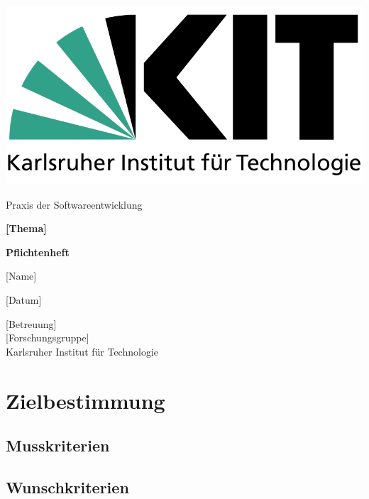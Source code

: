 \documentclass[a4paper]{scrreprt}
\begin{document}
    \begin{flushright}
        \includegraphics[scale = 0.2]{kit-logo.png}\\[0.5cm]
    \end{flushright}
    \vspace*{2cm}

    \begin{center} 
    		\large Praxis der Softwareentwicklung
        \vspace*{1.5cm}

        \textbf{\huge [Thema]}
        \vspace*{1cm}

        \textbf{\Large Pflichtenheft}
        \vspace*{2cm}

        [Name]
        \vspace*{1cm}

        [Datum]
        \vspace*{2.5cm}

        [Betreuung]\\[0.5cm]
        [Forschungsgruppe]\\[0.5cm]

        Karlsruher Institut für Technologie
    \end{center}
    \thispagestyle{empty}

    \tableofcontents

    \chapter{Zielbestimmung}
        \section{Musskriterien}

        \section{Wunschkriterien}
\end{document}

